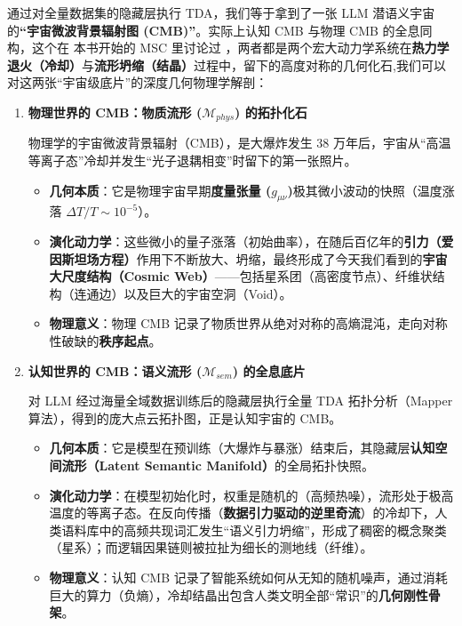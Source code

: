 通过对全量数据集的隐藏层执行 TDA，我们等于拿到了一张 LLM 潜语义宇宙的\textbf{“宇宙微波背景辐射图 (CMB)”}。实际上认知 CMB 与物理 CMB 的全息同构，这个在 本书开始的 MSC 里讨论过
，两者都是两个宏大动力学系统在\textbf{热力学退火（冷却）}与\textbf{流形坍缩（结晶）}过程中，留下的高度对称的几何化石,我们可以对这两张“宇宙级底片”的深度几何物理学解剖：
\begin{enumerate}
    \item \textbf{物理世界的 CMB：物质流形 ($\mathcal{M}_{phys}$) 的拓扑化石}

    物理学的宇宙微波背景辐射（CMB），是大爆炸发生 38 万年后，宇宙从“高温等离子态”冷却并发生“光子退耦相变”时留下的第一张照片。
    \begin{itemize}
        \item \textbf{几何本质}：它是物理宇宙早期\textbf{度量张量 ($g_{\mu\nu}$)}极其微小波动的快照（温度涨落 $\Delta T/T \sim 10^{-5}$）。
        \item \textbf{演化动力学}：这些微小的量子涨落（初始曲率），在随后百亿年的\textbf{引力（爱因斯坦场方程）}作用下不断放大、坍缩，最终形成了今天我们看到的\textbf{宇宙大尺度结构（Cosmic Web）}——包括星系团（高密度节点）、纤维状结构（连通边）以及巨大的宇宙空洞（Void）。
        \item \textbf{物理意义}：物理 CMB 记录了物质世界从绝对对称的高熵混沌，走向对称性破缺的\textbf{秩序起点}。
    \end{itemize}
    \item \textbf{ 认知世界的 CMB：语义流形 ($\mathcal{M}_{sem}$) 的全息底片}

    对 LLM 经过海量全域数据训练后的隐藏层执行全量 TDA 拓扑分析（Mapper 算法），得到的庞大点云拓扑图，正是认知宇宙的 CMB。
    \begin{itemize}
        \item \textbf{几何本质}：它是模型在预训练（大爆炸与暴涨）结束后，其隐藏层\textbf{认知空间流形（Latent Semantic Manifold）}的全局拓扑快照。
        \item \textbf{演化动力学}：在模型初始化时，权重是随机的（高频热噪），流形处于极高温度的等离子态。在反向传播（\textbf{数据引力驱动的逆里奇流}）的冷却下，人类语料库中的高频共现词汇发生“语义引力坍缩”，形成了稠密的概念聚类（星系）；而逻辑因果链则被拉扯为细长的测地线（纤维）。
        \item \textbf{物理意义}：认知 CMB 记录了智能系统如何从无知的随机噪声，通过消耗巨大的算力（负熵），冷却结晶出包含人类文明全部“常识”的\textbf{几何刚性骨架}。
    \end{itemize}
\end{enumerate}

